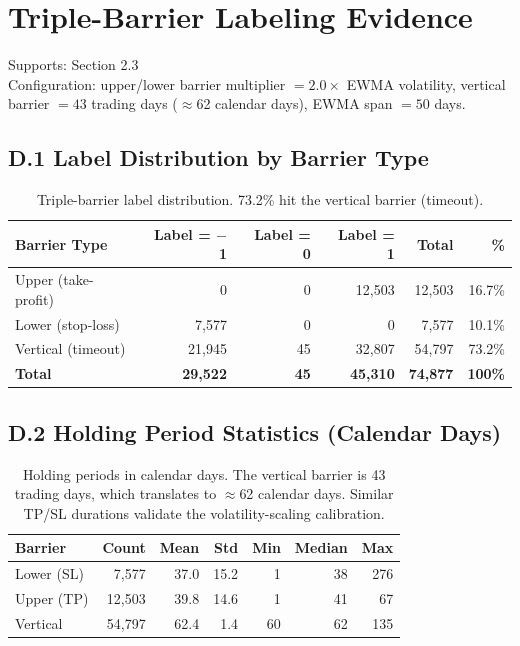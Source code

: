 \documentclass[11pt, a4paper]{article}
\begin{document}
\clearpage
\section{Triple-Barrier Labeling Evidence}
Supports: Section 2.3\\
Configuration: upper/lower barrier multiplier $= 2.0\times$ EWMA volatility, vertical barrier $= 43$ trading days ($\approx$62 calendar days), EWMA span $= 50$ days.

\subsection*{D.1 Label Distribution by Barrier Type}
\begin{table}[h]
\centering
\begin{tabular}{lrrrrr}
\toprule
\textbf{Barrier Type} & \textbf{Label = $-$1} & \textbf{Label = 0} & \textbf{Label = 1} & \textbf{Total} & \textbf{\%} \\
\midrule
Upper (take-profit) & 0 & 0 & 12,503 & 12,503 & 16.7\% \\
Lower (stop-loss) & 7,577 & 0 & 0 & 7,577 & 10.1\% \\
Vertical (timeout) & 21,945 & 45 & 32,807 & 54,797 & 73.2\% \\
\midrule
\textbf{Total} & \textbf{29,522} & \textbf{45} & \textbf{45,310} & \textbf{74,877} & \textbf{100\%} \\
\bottomrule
\end{tabular}
\caption{Triple-barrier label distribution. 73.2\% hit the vertical barrier (timeout).}
\end{table}

\subsection*{D.2 Holding Period Statistics (Calendar Days)}
\begin{table}[h]
\centering
\begin{tabular}{lrrrrrr}
\toprule
\textbf{Barrier} & \textbf{Count} & \textbf{Mean} & \textbf{Std} & \textbf{Min} & \textbf{Median} & \textbf{Max} \\
\midrule
Lower (SL) & 7,577 & 37.0 & 15.2 & 1 & 38 & 276 \\
Upper (TP) & 12,503 & 39.8 & 14.6 & 1 & 41 & 67 \\
Vertical & 54,797 & 62.4 & 1.4 & 60 & 62 & 135 \\
\bottomrule
\end{tabular}
\caption{Holding periods in calendar days. The vertical barrier is 43 trading days, which translates to $\approx$62 calendar days. Similar TP/SL durations validate the volatility-scaling calibration.}
\end{table}
\end{document}
